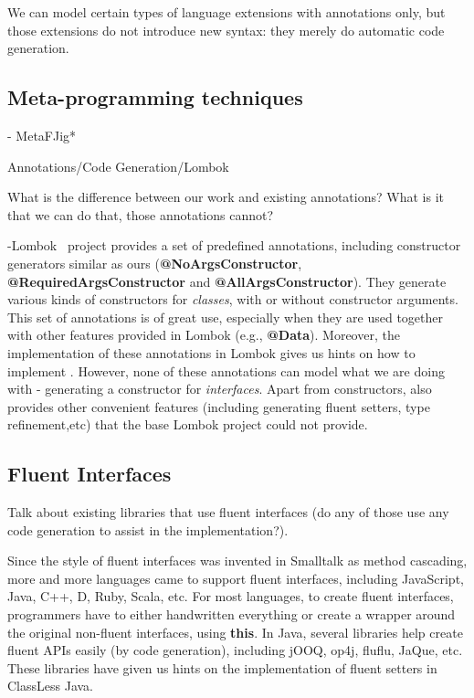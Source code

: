 We can model certain types of language extensions with annotations 
only, but those extensions do not introduce new syntax: they 
merely do automatic code generation. 

\subsection{Meta-programming techniques}
- MetaFJig*~\cite{}

Annotations/Code Generation/Lombok

What is the difference between our work and existing annotations?
What is it that we can do that, those annotations cannot?

-Lombok~\cite{} project provides a set of predefined annotations, including
constructor generators similar as ours (\textbf{@NoArgsConstructor},
\textbf{@RequiredArgsConstructor} and \textbf{@AllArgsConstructor}). They
generate various kinds of constructors for \emph{classes}, with or without
constructor arguments. This set of annotations is of great use, especially when
they are used together with other features provided in Lombok (e.g.,
\textbf{@Data}). Moreover, the implementation of these annotations in Lombok
gives us hints on how to implement \mixin. However, none of these annotations
can model what we are doing with \mixin - generating a constructor for
\emph{interfaces}. Apart from constructors, \mixin also provides other
convenient features (including generating fluent setters, type refinement,etc)
that the base Lombok project could not provide.

\subsection{Fluent Interfaces}
Talk about existing libraries that use fluent interfaces (do any of
those use any code generation to assist in the implementation?).

Since the style of fluent interfaces was invented in Smalltalk as method
cascading, more and more languages came to support fluent interfaces, including
JavaScript, Java, C++, D, Ruby, Scala, etc. For most languages, to create fluent
interfaces, programmers have to either handwritten everything or create a
wrapper around the original non-fluent interfaces, using \textbf{this}. In Java,
several libraries help create fluent APIs easily (by code generation), including
jOOQ, op4j, fluflu, JaQue, etc. These libraries have given us hints on the
implementation of fluent setters in ClassLess Java.

